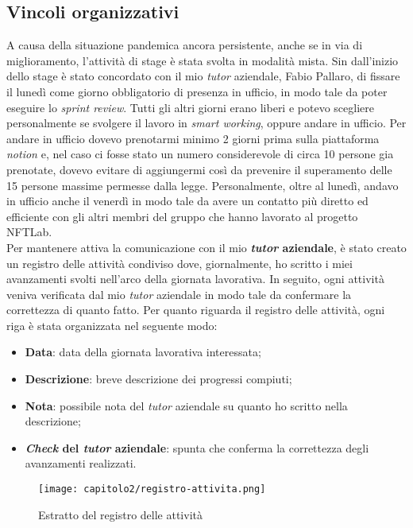 \subsection{Vincoli organizzativi}
A causa della situazione pandemica ancora persistente, anche se in via di miglioramento, l'attività di stage è stata svolta in modalità mista. Sin dall'inizio dello stage è stato concordato con il mio \textit{tutor} aziendale, Fabio Pallaro, di fissare il lunedì come giorno obbligatorio di presenza in ufficio, in modo tale da poter eseguire lo \textit{sprint review}. 
Tutti gli altri giorni erano liberi e potevo scegliere personalmente se svolgere il lavoro in \textit{smart working}, oppure andare in ufficio. Per andare in ufficio dovevo prenotarmi minimo 2 giorni prima sulla piattaforma \textit{notion} e, nel caso ci fosse stato un numero considerevole di circa 10 persone gia prenotate, dovevo evitare di aggiungermi così da prevenire il superamento delle 15 persone massime permesse dalla legge.
Personalmente, oltre al lunedì, andavo in ufficio anche il venerdì in modo tale da avere un contatto più diretto ed efficiente con gli altri membri del gruppo che hanno lavorato al progetto NFTLab.\\

Per mantenere attiva la comunicazione con il mio \textbf{\textit{tutor} aziendale}, è stato creato un registro delle attività condiviso dove, giornalmente, ho scritto i miei avanzamenti svolti nell'arco della giornata lavorativa. In seguito, ogni attività veniva verificata dal mio \textit{tutor} aziendale in modo tale da confermare la correttezza di quanto fatto. Per quanto riguarda il registro delle attività, ogni riga è stata organizzata nel seguente modo:
\begin{itemize}
  \item \textbf{Data}: data della giornata lavorativa interessata;
  \item \textbf{Descrizione}: breve descrizione dei progressi compiuti; 
  \item \textbf{Nota}: possibile nota del \textit{tutor} aziendale su quanto ho scritto nella descrizione;
  \item \textbf{\textit{Check} del \textit{tutor} aziendale}: spunta che conferma la correttezza degli avanzamenti realizzati.
\end{itemize}

\clearpage

\begin{figure}[!h]
  \centering
  \texttt{[image: capitolo2/registro-attivita.png]}
  \caption{Estratto del registro delle attività}
\end{figure}

